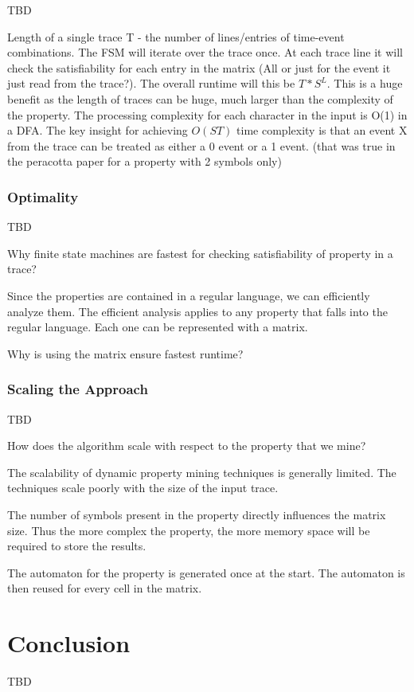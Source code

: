 \documentclass[]{sigplanconf}
\begin{document}
TBD

Length of a single trace T - the number of lines/entries of time-event combinations. 
The FSM will iterate over the trace once. At each trace line it will check the satisfiability for each entry in the matrix (All or just for the event it just read from the trace?). The overall runtime will this be $T * S^L$. 
This is a huge benefit as the length of traces can be huge, much larger than the complexity of the property. 
The processing complexity for each character in the input is O(1) in a DFA.
The key insight for achieving $O(ST)$ time complexity is that an event X from the trace can be treated as either a 0 event or a 1 event. (that was true in the peracotta paper for a property with 2 symbols only)

\subsubsection{Optimality}

TBD

Why finite state machines are fastest for checking satisfiability of property in a trace? 

Since the properties are contained in a regular language, we can efficiently analyze them. The efficient analysis applies to any property that falls into the regular language. Each one can be represented with a matrix. 

Why is using the matrix ensure fastest runtime?

\subsubsection{Scaling the Approach}

TBD

How does the algorithm scale with respect to the property that we mine?

The scalability of dynamic property mining techniques is generally limited.
The techniques scale poorly with the size of the input trace. 


The number of symbols present in the property directly influences the matrix size. Thus the more complex the property, the more memory space will be required to store the results. 

The automaton for the property is generated once at the start. The automaton is then reused for every cell in the matrix.

\section{Conclusion}

TBD


%


\end{document}
